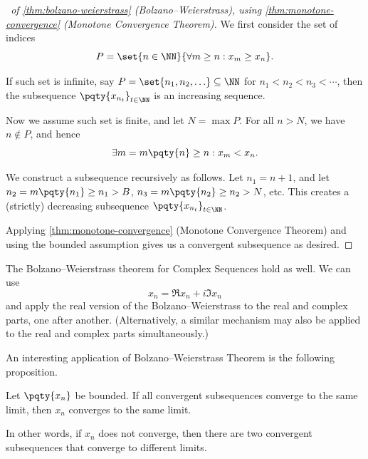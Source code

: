 \begin{proof}[\proofname\ of \autoref{thm:bolzano-weierstrass} (Bolzano--Weierstrass), using \autoref{thm:monotone-convergence} (Monotone Convergence Theorem)]
    We first consider the set of indices
    \[
        P = \set{n \in \NN}{\forall m \geq n: x_m \geq x_n}.
    \]

    If such set is infinite, say \(P = \set{n_1, n_2, \ldots} \subseteq \NN\) for \(n_1 < n_2 < n_3 < \cdots\), then the subsequence \(\pqty{x_{n_t}}_{t \in \NN}\) is an increasing sequence.

    Now we assume such set is finite, and let \(N = \max P\). For all \(n > N\), we have \(n \notin P\), and hence
    \[
        \exists m = m\pqty{n} \geq n: x_m < x_n.
    \]

    We construct a subsequence recursively as follows. Let \(n_1 = n + 1\), and let \(n_2 = m\pqty{n_1} \geq n_1 > B\), \(n_3 = m\pqty{n_2} \geq n_2 > N\), etc. This creates a (strictly) decreasing subsequence \(\pqty{x_{n_t}}_{t \in \NN}\).

    Applying \autoref{thm:monotone-convergence} (Monotone Convergence Theorem) and using the bounded assumption gives us a convergent subsequence as desired.
\end{proof}

The Bolzano--Weierstrass theorem for Complex Sequences hold as well. We can use
\[
    x_n = \Re x_n + i \Im x_n
\]
and apply the real version of the Bolzano--Weierstrass to the real and complex parts, one after another. (Alternatively, a similar mechanism may also be applied to the real and complex parts simultaneously.)

An interesting application of Bolzano--Weierstrass Theorem is the following proposition.

\begin{proposition}
    \label{prop:convergence-via-subsequences}%
    Let \(\pqty{x_n}\) be bounded. If all convergent subsequences converge to the same limit, then \(x_n\) converges to the same limit.

    In other words, if \(x_n\) does not converge, then there are two convergent subsequences that converge to different limits.
\end{proposition}

